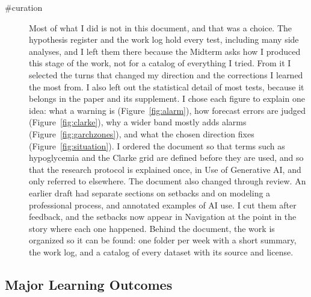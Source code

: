 \begin{description}
\item[\#curation] Most of what I did is not in this document, and that was a choice. The hypothesis register and the work log hold every test, including many side analyses, and I left them there because the Midterm asks how I produced this stage of the work, not for a catalog of everything I tried. From it I selected the turns that changed my direction and the corrections I learned the most from. I also left out the statistical detail of most tests, because it belongs in the paper and its supplement. I chose each figure to explain one idea: what a warning is (Figure~\ref{fig:alarm}), how forecast errors are judged (Figure~\ref{fig:clarke}), why a wider band mostly adds alarms (Figure~\ref{fig:garchzones}), and what the chosen direction fixes (Figure~\ref{fig:situation}). I ordered the document so that terms such as hypoglycemia and the Clarke grid are defined before they are used, and so that the research protocol is explained once, in Use of Generative AI, and only referred to elsewhere. The document also changed through review. An earlier draft had separate sections on setbacks and on modeling a professional process, and annotated examples of AI use. I cut them after feedback, and the setbacks now appear in Navigation at the point in the story where each one happened. Behind the document, the work is organized so it can be found: one folder per week with a short summary, the work log, and a catalog of every dataset with its source and license.
\end{description}

\subsection{Major Learning Outcomes}

